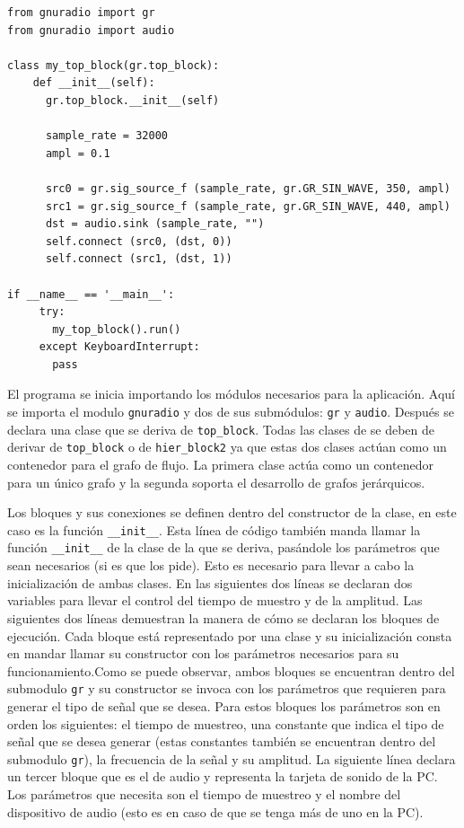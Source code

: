 \begin{lstlisting}[float,frame=single,label=ex:radioexp,caption={Ejemplo de programa utilizando \gnuradio}] 
from gnuradio import gr 
from gnuradio import audio

class my_top_block(gr.top_block):
    def __init__(self):
      gr.top_block.__init__(self)

      sample_rate = 32000
      ampl = 0.1

      src0 = gr.sig_source_f (sample_rate, gr.GR_SIN_WAVE, 350, ampl)
      src1 = gr.sig_source_f (sample_rate, gr.GR_SIN_WAVE, 440, ampl)
      dst = audio.sink (sample_rate, "")
      self.connect (src0, (dst, 0))
      self.connect (src1, (dst, 1))

if __name__ == '__main__':
     try:
       my_top_block().run()
     except KeyboardInterrupt:
       pass
\end{lstlisting}

El programa se inicia importando los m\'odulos necesarios para la aplicaci\'on.
Aqu\'i se importa el modulo \verb|gnuradio| y dos de sus subm\'odulos: \verb|gr| y
\verb|audio|. Despu\'es se declara una clase que se deriva de \verb|top_block|.
Todas las clases de \gnuradio se deben de derivar de
\verb|top_block| o de \verb|hier_block2| ya que estas dos clases act\'uan como
un contenedor para el grafo de flujo. La primera clase act\'ua como un
contenedor para un \'unico grafo y la segunda soporta el desarrollo de
grafos jer\'arquicos.

Los bloques y sus conexiones se definen dentro del constructor de la clase, en este caso es la funci\'on \verb|__init__|. Esta
l\'inea de c\'odigo tambi\'en manda llamar la funci\'on \verb|__init__| de la clase de la que se deriva, pas\'andole los
par\'ametros que sean necesarios (si es que los pide). Esto es necesario para llevar a cabo la inicializaci\'on de ambas clases.
En las siguientes dos l\'ineas se declaran dos variables para llevar el control del tiempo de muestro y de la amplitud. Las
siguientes dos l\'ineas demuestran la manera de c\'omo se declaran los bloques de ejecuci\'on. Cada bloque est\'a representado
por una clase y su inicializaci\'on consta en mandar llamar su constructor con los par\'ametros necesarios para su
funcionamiento.Como se puede observar, ambos bloques se encuentran dentro del submodulo \verb|gr| y su constructor se invoca con
los par\'ametros que requieren para generar el tipo de se\~nal que se desea. Para estos bloques los par\'ametros son en orden los
siguientes: el tiempo de muestreo, una constante que indica el tipo de se\~nal que se desea generar (estas constantes tambi\'en
se encuentran dentro del submodulo \verb|gr|), la frecuencia de la se\~nal y su amplitud. La siguiente l\'inea declara un tercer
bloque que es el de audio y representa la tarjeta de sonido de la PC. Los par\'ametros que necesita son el tiempo de muestreo y
el nombre del dispositivo de audio (esto es en caso de que se tenga m\'as de uno en la PC).

